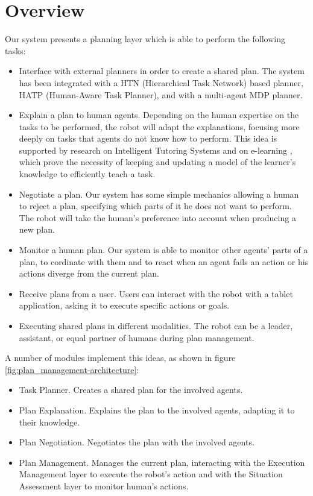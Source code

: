 \section{Overview}
\label{sec:plan_management-overview}
Our system presents a planning layer which is able to perform the following tasks:
\begin{itemize}
	\item Interface with external planners in order to create a shared plan. The system has been integrated with a HTN (Hierarchical Task Network) based planner, HATP (Human-Aware Task Planner), and with a multi-agent MDP planner.
	\item Explain a plan to human agents. Depending on the human expertise on the tasks to be performed, the robot will adapt the explanations, focusing more deeply on tasks that agents do not know how to perform. This idea is supported by research on Intelligent Tutoring Systems \cite{brusilovskiy1994construction}  and on e-learning \cite{brusilovskiy2005}, which  prove the necessity of keeping and updating a model of the learner's knowledge to efficiently teach a task.
	\item Negotiate a plan. Our system has some simple mechanics allowing a human to reject a plan, specifying which parts of it he does not want to perform. The robot will take the human's preference into account when producing a new plan.
	\item Monitor a human plan. Our system is able to monitor other agents' parts of a plan, to cordinate with them and to react when an agent fails an action or his actions diverge from the current plan.
	\item Receive plans from a user. Users can interact with the robot with a tablet application, asking it to execute specific actions or goals.
	\item Executing shared plans in different modalities. The robot can be a leader, assistant, or equal partner of humans during plan management.
\end{itemize}

A number of modules implement this ideas, as shown in figure \ref{fig:plan_management-architecture}:
\begin{itemize}
\item Task Planner. Creates a shared plan for the involved agents.
\item Plan Explanation. Explains the plan to the involved agents, adapting it to their knowledge.
\item Plan Negotiation. Negotiates the plan with the involved agents.
\item Plan Management. Manages the current plan, interacting with the Execution Management layer to execute the robot's action and with the Situation Assessment layer to monitor human's actions.
\end{itemize}


